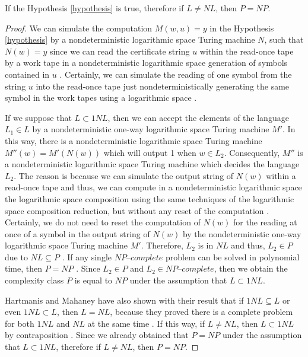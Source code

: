 \documentclass[a4paper,UKenglish,cleveref, autoref]{lipics-v2019}
\begin{document}
\begin{theorem}
\label{implication}
If the Hypothesis \ref{hypothesis} is true, therefore if $L \neq NL$, then $P = NP$.
\end{theorem}

\begin{proof}
We can simulate the computation $M(w, u) = y$ in the Hypothesis \ref{hypothesis} by a nondeterministic logarithmic space Turing machine $N$, such that $N(w) = y$ since we can read the certificate string $u$ within the read-once tape by a work tape in a nondeterministic logarithmic space generation of symbols contained in $u$ \cite{Pap03}. Certainly, we can simulate the reading of one symbol from the string $u$ into the read-once tape just nondeterministically generating the same symbol in the work tapes using a logarithmic space \cite{Pap03}.

If we suppose that $L \subset 1NL$, then we can accept the elements of the language $L_{1} \in L$ by a nondeterministic one-way logarithmic space Turing machine $M'$. In this way, there is a nondeterministic logarithmic space Turing machine $M''(w) = M'(N(w))$ which will output 1 when $w \in L_{2}$. Consequently, $M''$ is a nondeterministic logarithmic space Turing machine which decides the language $L_{2}$. The reason is because we can simulate the output string of $N(w)$ within a read-once tape and thus, we can compute in a nondeterministic logarithmic space the logarithmic space composition using the same techniques of the logarithmic space composition reduction, but without any reset of the computation \cite{Pap03}. Certainly, we do not need to reset the computation of $N(w)$ for the reading at once of a symbol in the output string of $N(w)$ by the nondeterministic one-way logarithmic space Turing machine $M'$. Therefore, $L_{2}$ is in $NL$ and thus, $L_{2} \in P$ due to $NL \subseteq P$ \cite{Pap03}. If any single $\textit{NP--complete}$ problem can be solved in polynomial time, then $P = NP$ \cite{CLRS01}. Since $L_{2} \in P$ and $L_{2} \in \textit{NP--complete}$, then we obtain the complexity class $P$ is equal to $NP$ under the assumption that $L \subset 1NL$.

Hartmanis and Mahaney have also shown with their result that if $1NL \subseteq L$ or even $1NL \subset L$, then $L=NL$, because they proved there is a complete problem for both $1NL$ and $NL$ at the same time \cite{HM81}. If this way, if $L \neq NL$, then $L \subset 1NL$ by contraposition \cite{Pap03}. Since we already obtained that $P = NP$ under the assumption that $L \subset 1NL$, therefore if $L \neq NL$, then $P = NP$.
\end{proof}
\end{document}
